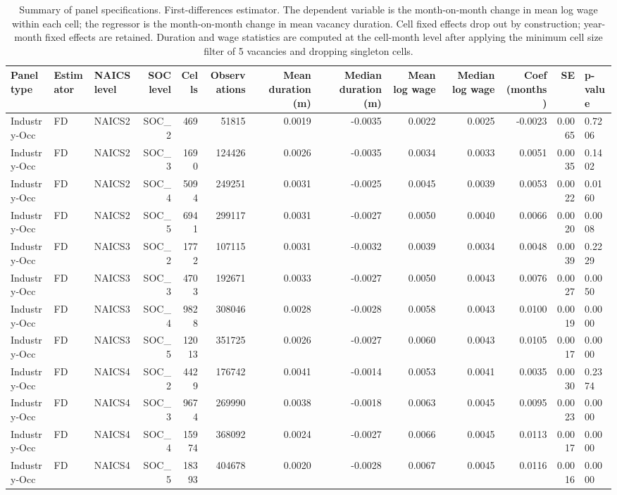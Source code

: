 \begin{table}
\caption{Summary of panel specifications. First-differences estimator. The dependent variable is the month-on-month change in mean log wage within each cell; the regressor is the month-on-month change in mean vacancy duration. Cell fixed effects drop out by construction; year-month fixed effects are retained. Duration and wage statistics are computed at the cell-month level after applying the minimum cell size filter of 5 vacancies and dropping singleton cells.}
\label{tab:model_summary_fd}
\begin{tabular}{lllrrrrrrrrr}
\toprule
Panel type & Estimator & NAICS level & SOC level & Cells & Observations & Mean duration (m) & Median duration (m) & Mean log wage & Median log wage & Coef (months) & SE & p-value \\
\midrule
Industry-Occ & FD & NAICS2 & SOC_2 & 469 & 51815 & 0.0019 & -0.0035 & 0.0022 & 0.0025 & -0.0023 & 0.0065 & 0.7206 \\
Industry-Occ & FD & NAICS2 & SOC_3 & 1690 & 124426 & 0.0026 & -0.0035 & 0.0034 & 0.0033 & 0.0051 & 0.0035 & 0.1402 \\
Industry-Occ & FD & NAICS2 & SOC_4 & 5094 & 249251 & 0.0031 & -0.0025 & 0.0045 & 0.0039 & 0.0053 & 0.0022 & 0.0160 \\
Industry-Occ & FD & NAICS2 & SOC_5 & 6941 & 299117 & 0.0031 & -0.0027 & 0.0050 & 0.0040 & 0.0066 & 0.0020 & 0.0008 \\
Industry-Occ & FD & NAICS3 & SOC_2 & 1772 & 107115 & 0.0031 & -0.0032 & 0.0039 & 0.0034 & 0.0048 & 0.0039 & 0.2229 \\
Industry-Occ & FD & NAICS3 & SOC_3 & 4703 & 192671 & 0.0033 & -0.0027 & 0.0050 & 0.0043 & 0.0076 & 0.0027 & 0.0050 \\
Industry-Occ & FD & NAICS3 & SOC_4 & 9828 & 308046 & 0.0028 & -0.0028 & 0.0058 & 0.0043 & 0.0100 & 0.0019 & 0.0000 \\
Industry-Occ & FD & NAICS3 & SOC_5 & 12013 & 351725 & 0.0026 & -0.0027 & 0.0060 & 0.0043 & 0.0105 & 0.0017 & 0.0000 \\
Industry-Occ & FD & NAICS4 & SOC_2 & 4429 & 176742 & 0.0041 & -0.0014 & 0.0053 & 0.0041 & 0.0035 & 0.0030 & 0.2374 \\
Industry-Occ & FD & NAICS4 & SOC_3 & 9674 & 269990 & 0.0038 & -0.0018 & 0.0063 & 0.0045 & 0.0095 & 0.0023 & 0.0000 \\
Industry-Occ & FD & NAICS4 & SOC_4 & 15974 & 368092 & 0.0024 & -0.0027 & 0.0066 & 0.0045 & 0.0113 & 0.0017 & 0.0000 \\
Industry-Occ & FD & NAICS4 & SOC_5 & 18393 & 404678 & 0.0020 & -0.0028 & 0.0067 & 0.0045 & 0.0116 & 0.0016 & 0.0000 \\

\end{tabular}
\end{table}
